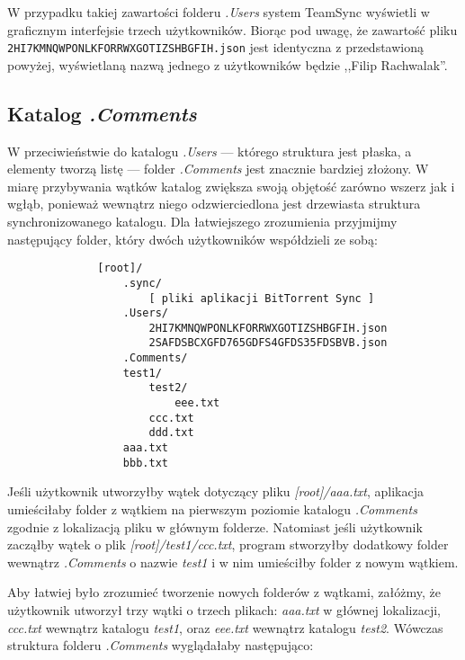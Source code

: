 W przypadku takiej zawartości folderu \emph{.Users} system TeamSync wyświetli w graficznym interfejsie trzech użytkowników. Biorąc pod uwagę, że zawartość pliku \texttt{2HI7KMNQWPONLKFORRWXGOTIZSHBGFIH.json} jest identyczna z przedstawioną powyżej, wyświetlaną nazwą jednego z użytkowników będzie ,,Filip Rachwalak''.

\subsection{Katalog \emph{.Comments}}

W przeciwieństwie do katalogu \emph{.Users} --- którego struktura jest płaska, a elementy tworzą listę --- folder \emph{.Comments} jest znacznie bardziej złożony. W miarę przybywania wątków katalog zwiększa swoją objętość zarówno wszerz jak i wgłąb, ponieważ wewnątrz niego odzwierciedlona jest drzewiasta struktura synchronizowanego katalogu. Dla łatwiejszego zrozumienia przyjmijmy następujący folder, który dwóch użytkowników współdzieli ze sobą:

\begin{minipage}{\linewidth}
\vspace{1em}
\begin{verbatim}
              [root]/
                  .sync/
                      [ pliki aplikacji BitTorrent Sync ]
                  .Users/
                      2HI7KMNQWPONLKFORRWXGOTIZSHBGFIH.json
                      2SAFDSBCXGFD765GDFS4GFDS35FDSBVB.json
                  .Comments/
                  test1/
                      test2/
                          eee.txt
                      ccc.txt
                      ddd.txt
                  aaa.txt
                  bbb.txt
\end{verbatim}
\vspace{1em}
\end{minipage}

Jeśli użytkownik utworzyłby wątek dotyczący pliku \emph{[root]/aaa.txt}, aplikacja umieściłaby folder z wątkiem na pierwszym poziomie katalogu \emph{.Comments} zgodnie z lokalizacją pliku w głównym folderze. Natomiast jeśli użytkownik zacząłby wątek o plik \emph{[root]/test1/ccc.txt}, program stworzyłby dodatkowy folder wewnątrz \emph{.Comments} o nazwie \emph{test1} i w nim umieściłby folder z nowym wątkiem.

Aby łatwiej było zrozumieć tworzenie nowych folderów z wątkami, załóżmy, że użytkownik utworzył trzy wątki o trzech plikach: \emph{aaa.txt} w głównej lokalizacji, \emph{ccc.txt} wewnątrz katalogu \emph{test1}, oraz \emph{eee.txt} wewnątrz katalogu \emph{test2}. Wówczas struktura folderu \emph{.Comments} wyglądałaby następująco:

